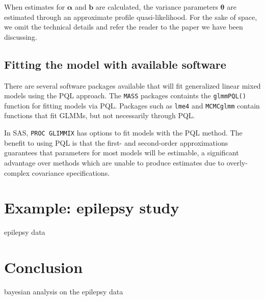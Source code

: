 \documentclass[12pt]{article}
\newcommand{\m}[1]{\mathbf{\bm{#1}}}
\begin{document}
When estimates for $\m{\alpha}$ and $\m{b}$ are calculated, the variance parameters $\m{\theta}$ are estimated through an approximate profile quasi-likelihood. For the sake of space, we omit the technical details and refer the reader to the paper we have been discussing.

\subsection{Fitting the model with available software}

\noindent There are several software packages available that will fit generalized linear mixed models using the PQL approach. The \texttt{MASS} packages containts the \texttt{glmmPQL()} function for fitting models via PQL. Packages such as \texttt{lme4} and \texttt{MCMCglmm} contain functions that fit GLMMs, but not necessarily through PQL.

In SAS, \texttt{PROC GLIMMIX} has options to fit models with the PQL method. The benefit to using PQL is that the first- and second-order approximations guarantees that parameters for most models will be estimable, a significant advantage over methods which are unable to produce estimates due to overly-complex covariance specifications.

\section{Example: epilepsy study}

epilepsy data \cite{thall:1990}

\section{Conclusion}

bayesian analysis on the epilepsy data \cite{fong:2009}



\end{document}
